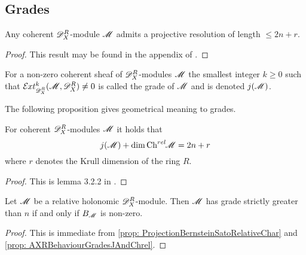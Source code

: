 \subsection{Grades}
\begin{proposition}\label{prop: ProjectiveResolutionLength}
  Any coherent $\mathscr{D}_X^R$-module $\mathscr{M}$ admits a projective resolution of length $\leq 2n + r$.
\end{proposition}
\begin{proof}
  This result may be found in the appendix of \cite{budur2019zero}.
\end{proof}
\begin{definition}
  For a non-zero coherent sheaf of $\mathscr{D}_X^R$-modules $\mathscr{M}$ the smallest integer $k\geq 0$ such that $\Ex{\D_X^R}{k}(\M,\D_X^R)\neq 0$ is called the grade of $\mathscr{M}$ and is denoted $j(\mathscr{M})$.
\end{definition}
The following proposition gives geometrical meaning to grades.
\begin{proposition}\label{prop: AXRBehaviourGradesJAndChrel}
  For coherent $\mathscr{D}_X^R$-modules $\mathscr{M}$ it holds that
  $$j(\mathscr{M}) + \dim \operatorname{Ch}^{rel}\mkern-5mu \mathscr{M} = 2n + r $$
  where $r$ denotes the Krull dimension of the ring $R$.
\end{proposition}
\begin{proof}
  This is lemma 3.2.2 in \cite{budur2019zero}.
\end{proof}
\begin{corollary}\label{cor: GradeIFFBernsteinIdeal}
  Let $\mathscr{M}$ be a relative holonomic $\mathscr{D}_X^R$-module. Then $\mathscr{M}$ has grade strictly greater than $n$ if and only if $B_{\mathscr{M}}$ is non-zero.
\end{corollary}
\begin{proof}
  This is immediate from \cref{prop: ProjectionBernsteinSatoRelativeChar} and \cref{prop: AXRBehaviourGradesJAndChrel}.
\end{proof}

